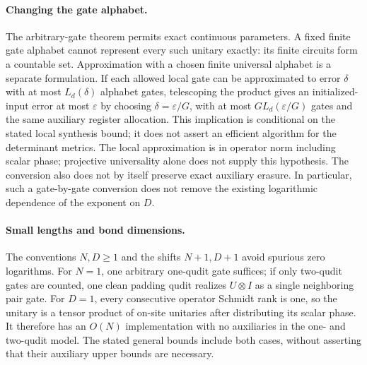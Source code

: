 \documentclass[11pt]{article}
\begin{document}
\paragraph{Changing the gate alphabet.}
The arbitrary-gate theorem permits exact continuous parameters.
A fixed finite gate alphabet cannot represent every such unitary
exactly: its finite circuits form a countable set.
Approximation with a chosen finite universal alphabet is a separate
formulation. If each allowed local gate can be approximated to error
$\delta$ with at most $L_d(\delta)$ alphabet gates, telescoping the
product gives an initialized-input error at most $\varepsilon$ by
choosing $\delta=\varepsilon/G$, with at most
$G L_d(\varepsilon/G)$ gates and the same auxiliary register allocation.
This implication is conditional on the stated local synthesis bound;
it does not assert an efficient algorithm for the determinant metrics.
The local approximation is in operator norm including scalar phase;
projective universality alone does not supply this hypothesis.
The conversion also does not by itself preserve exact auxiliary erasure.
In particular, such a gate-by-gate conversion does not remove the
existing logarithmic dependence of the exponent on $D$.

\paragraph{Small lengths and bond dimensions.}
The conventions $N,D\ge1$ and the shifts $N+1,D+1$ avoid spurious
zero logarithms. For $N=1$, one arbitrary one-qudit gate suffices;
if only two-qudit gates are counted, one clean padding qudit realizes
$U\otimes I$ as a single neighboring pair gate.
For $D=1$, every consecutive operator Schmidt rank is one, so the
unitary is a tensor product of on-site unitaries after distributing
its scalar phase. It therefore has an $O(N)$ implementation with no
auxiliaries in the one- and two-qudit model. The stated general
bounds include both cases, without asserting that their auxiliary
upper bounds are necessary.
\end{document}
